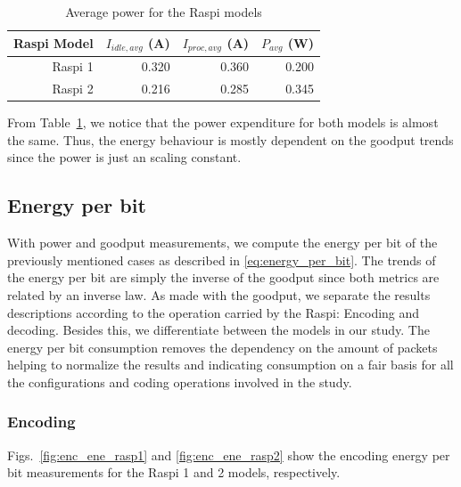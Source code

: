 \begin{table}[H]
\center
\caption{Average power for the \ac{Raspi} models}
\begin{tabular}{|r|r|r|r|}

\hline
\ac{Raspi} Model & $I_{idle,avg}$ (A)& $I_{proc,avg}$ (A) & $P_{avg}$ (W) \\
\hline
\hline
    \ac{Raspi} 1 &      0.320        &            0.360    & 0.200\\
\hline
    \ac{Raspi} 2 &      0.216        &            0.285    & 0.345\\
\hline
\end{tabular}
\vspace{0.2cm}
\label{tab:average_power_table}
\end{table}
%
From Table~\ref{tab:average_power_table}, we notice that the power expenditure
for both models is almost the same. Thus, the energy behaviour is mostly
dependent on the goodput trends since the power is just an scaling constant.
%
\subsection{Energy per bit}
With power and goodput measurements, we compute the energy per bit of
the previously mentioned cases as described in \eqref{eq:energy_per_bit}.
The trends of the energy per bit are simply the inverse of the goodput since
both metrics are related by an inverse law. As made with the goodput, we
separate the results descriptions according to the operation carried by the
\ac{Raspi}: Encoding and decoding. Besides this, we differentiate between
the models in our study. The energy per bit consumption removes the dependency
on the amount of packets helping to normalize the results and indicating
consumption on a fair basis for all the configurations and coding operations
involved in the study. 

\subsubsection{Encoding}
Figs.~\ref{fig:enc_ene_rasp1} and \ref{fig:enc_ene_rasp2} show the encoding
energy per bit measurements for the \ac{Raspi} 1 and 2 models, respectively.

